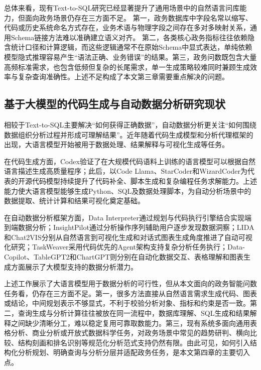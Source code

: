 总体来看，现有Text-to-SQL研究已经显著提升了通用场景中的自然语言问库能力，但面向政务场景仍存在三方面不足。
第一，政务数据库中字段名常以缩写、代码或历史系统命名方式存在，业务术语与物理字段之间存在多对多映射关系，通用Schema链接方法难以准确建立语义对齐。
第二，各类核心政务指标往往依赖隐含统计口径和计算逻辑，而这些逻辑通常不在原始Schema中显式表达，单纯依赖模型隐式推理容易产生“语法正确、业务错误”的结果。第三，政务问数既包含大量高频标准需求，也包含低频但复杂的长尾需求，单一生成策略较难同时兼顾生成效率与复杂查询准确性。上述不足构成了本文第三章需要重点解决的问题。

\subsection{基于大模型的代码生成与自动数据分析研究现状}

相较于Text-to-SQL主要解决“如何获得正确数据”，自动数据分析更关注“如何围绕数据组织分析过程并形成可理解结果”。近年随着代码生成模型和分析代理框架的出现，大语言模型开始被用于数据处理、结果解释与可视化生成等任务。

在代码生成方面，Codex\cite{chen2021codex}验证了在大规模代码语料上训练的语言模型可以根据自然语言描述生成高质量程序；此后，以Code Llama、StarCoder和WizardCoder为代表的开源代码模型持续提升了代码补全、脚本生成和复杂编程任务求解能力\cite{roziere2023codellama,li2023starcoder,luo2023wizardcoder}。上述能力使大语言模型能够生成Python、SQL及数据处理脚本，为自动分析场景中的数据提取、统计计算和结果可视化奠定基础。

在自动数据分析框架方面，Data Interpreter\cite{hong2024datainterpreter}通过规划与代码执行引擎结合实现端到端数据分析；InsightPilot\cite{ma2023insightpilot}通过分析操作序列辅助用户逐步发现数据洞察；LIDA\cite{dibia2023lida}和Chat2VIS\cite{maddigan2023chat2vis}分别从自然语言到可视化生成和对话式图表生成角度推进了自动可视化研究；TaskWeaver\cite{qin2024taskweaver}采用代码优先的Agent架构支持复杂分析任务执行；Data-Copilot\cite{zhang2024datacopilot}、TableGPT2\cite{huang2024tablegpt}和ChartGPT\cite{tian2024chartgpt}则分别在自动化数据交互、表格理解和图表生成方面展示了大模型支持的数据分析潜力。

上述工作展示了大语言模型用于数据分析的可行性，但从本文面向的政务智能问数任务看，仍存在三方面不足。第一，很多方法直接从自然语言需求生成代码、图表或结论，中间规划表示不够显式，不利于校验分析对象、指标和约束是否一致。第二，查询生成与分析计算往往被放在同一流程中，数据库理解、SQL生成和结果解释之间缺少清晰分工，难以稳定复用可靠取数能力。第三，现有系统多面向通用表格分析、商业分析或开放式数据科学任务，对政务场景中常见的趋势研判、横向比较、结构刻画和排名识别等规范化分析范式支持仍然有限。由此可见，如何引入结构化分析规划、明确查询与分析分层并适配政务任务，是本文第四章的主要切入点。


